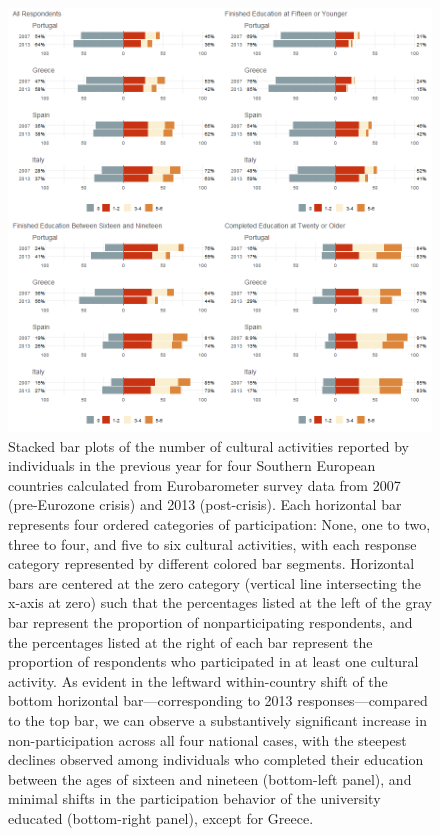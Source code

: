 \documentclass{article}
\begin{document}
\begin{figure}
    \centering
    \includegraphics[width=1.0\textwidth]{cult-cat-by-year-by-country-combo.png}
    \caption{Stacked bar plots of the number of cultural activities reported by individuals in the previous year for four Southern European countries calculated from Eurobarometer survey data from 2007 (pre-Eurozone crisis) and 2013 (post-crisis). Each horizontal bar represents four ordered categories of participation: None, one to two, three to four, and five to six cultural activities, with each response category represented by different colored bar segments. Horizontal bars are centered at the zero category (vertical line intersecting the x-axis at zero) such that the percentages listed at the left of the gray bar represent the proportion of nonparticipating respondents, and the percentages listed at the right of each bar represent the proportion of respondents who participated in at least one cultural activity. As evident in the leftward within-country shift of the bottom horizontal bar---corresponding to 2013 responses---compared to the top bar, we can observe a substantively significant increase in non-participation across all four national cases, with the steepest declines observed among individuals who completed their education between the ages of sixteen and nineteen (bottom-left panel), and minimal shifts in the participation behavior of the university educated (bottom-right panel), except for Greece.}
    \label{fig: main}
\end{figure}
\end{document}
